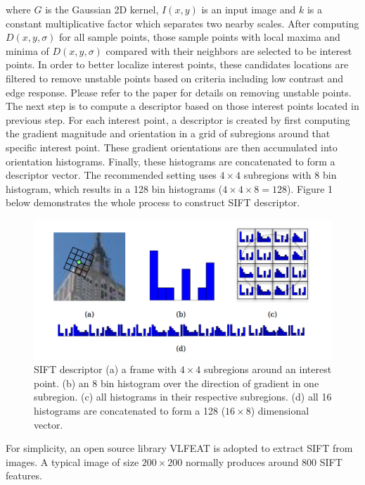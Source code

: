 \noindent where $G$ is the Gaussian 2D kernel, $I(x, y)$ is an input image and $k$ is a constant multiplicative factor which separates two nearby scales. After computing $D(x, y, \sigma)$ for all sample points, those sample points with local maxima and minima of $D(x, y, \sigma)$ compared with their neighbors are selected to be interest points. In order to better localize interest points, these candidates locations are filtered to remove unstable points based on criteria including low contrast and edge response. Please refer to the paper \cite{lowe2004distinctive} for details on removing unstable points. The next step is to compute a descriptor based on those interest points located in previous step. For each interest point, a descriptor is created by first computing the gradient magnitude and orientation in a grid of subregions around that specific interest point. These gradient orientations are then accumulated into orientation histograms. Finally, these histograms are concatenated to form a descriptor vector. The recommended setting uses $4 \times 4$ subregions with 8 bin histogram, which results in a 128 bin histograms ($4 \times 4 \times 8 = 128$). Figure 1 below demonstrates the whole process to construct SIFT descriptor. \\

\begin{figure}[!ht]
\centering
  \includegraphics[width=1\textwidth]{./SIFT_Descriptor.png}
\caption{SIFT descriptor \cite{solem2012programming} (a) a frame with $4 \times 4$ subregions around an interest point. (b) an 8 bin histogram over the direction of gradient in one subregion. (c) all histograms in their respective subregions. (d) all 16 histograms are concatenated to form a 128 ($16 \times 8$) dimensional vector.}
\end{figure}

\noindent For simplicity, an open source library VLFEAT \cite{vedaldi08vlfeat} is adopted to extract SIFT from images. A typical image of size $200 \times 200$ normally produces around 800 SIFT features.  


